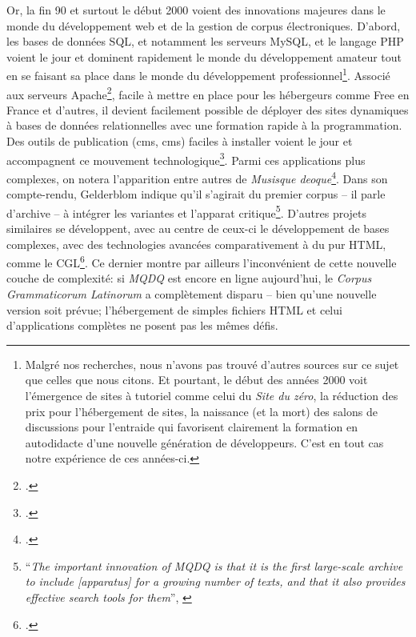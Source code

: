 Or, la fin 90 et surtout le début 2000 voient des innovations majeures dans le monde du développement web et de la gestion de corpus électroniques. D'abord, les bases de données SQL, et notamment les serveurs MySQL, et le langage PHP voient le jour et dominent rapidement le monde du développement amateur tout en se faisant sa place dans le monde du développement professionnel\footnote{Malgré nos recherches, nous n'avons pas trouvé d'autres sources sur ce sujet que celles que nous citons. Et pourtant, le début des années 2000 voit l'émergence de sites à tutoriel comme celui du \textit{Site du zéro}, la réduction des prix pour l'hébergement de sites, la naissance (et la mort) des salons de discussions pour l'entraide qui favorisent clairement la formation en autodidacte d'une nouvelle génération de développeurs. C'est en tout cas notre expérience de ces années-ci.}. Associé aux serveurs Apache\footcite{smith_lamp_nodate}, facile à mettre en place pour les hébergeurs comme Free en France et d'autres, il devient facilement possible de déployer des sites dynamiques à bases de données relationnelles avec une formation rapide à la programmation. Des outils de publication (\acrshort{cms}, \acrlong{cms}) faciles à installer voient le jour et accompagnent ce mouvement technologique\footcite{purer_php_nodate}. Parmi ces applications plus complexes, on notera l'apparition entre autres de \textit{Musisque deoque}\footcite{gelderblom_musisque_2008}. Dans son compte-rendu, Gelderblom indique qu'il s'agirait du premier corpus -- il parle d'archive -- à intégrer les variantes et l'apparat critique\footnote{``\textit{The important innovation of MQDQ is that it is the first large-scale archive to include [apparatus] for a growing number of texts, and that it also provides effective search tools for them}'', \cite[p.233]{gelderblom_musisque_2008}}. D'autres projets similaires se développent, avec au centre de ceux-ci le développement de bases complexes, avec des technologies avancées comparativement à du pur HTML, comme le CGL\footcite{garcea_corpus_2010}. Ce dernier montre par ailleurs l'inconvénient de cette nouvelle couche de complexité: si \textit{MQDQ} est encore en ligne aujourd'hui, le \textit{Corpus Grammaticorum Latinorum} a complètement disparu -- bien qu'une nouvelle version soit prévue; l'hébergement de simples fichiers HTML et celui d'applications complètes ne posent pas les mêmes défis.

